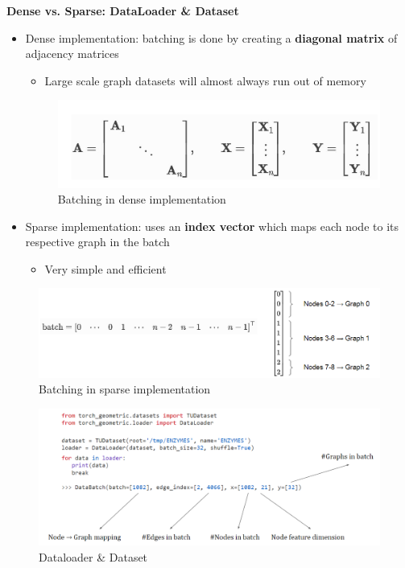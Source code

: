\textbf{Dense vs. Sparse: DataLoader \& Dataset}\\
\begin{itemize}
    \item Dense implementation: batching is done by creating a \textbf{diagonal matrix} of adjacency
matrices
\begin{itemize}
    \item Large scale graph datasets will almost always run out of memory
\end{itemize}

\begin{figure}[h!t]
    \centering
    \includegraphics[width=0.75\linewidth]{dense.png}
    \caption{Batching in dense implementation}
    \label{fig:enter-label}
\end{figure}

\item Sparse implementation: uses an\textbf{ index vector} which maps each node to its respective
graph in the batch
\begin{itemize}
    \item Very simple and efficient
\end{itemize}
\end{itemize}

\begin{figure}[h!t]
    \centering
    \includegraphics[width=1\linewidth]{sparse.png}
    \caption{Batching in sparse implementation}
    \label{fig:enter-label}
\end{figure}
\begin{figure}[h!t]
    \centering
    \includegraphics[width=1\linewidth]{dataset.png}
    \caption{Dataloader \& Dataset}
    \label{fig:enter-label}
\end{figure}
